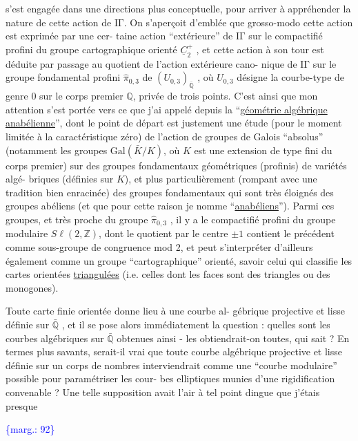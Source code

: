 \documentclass[11pt]{article}
\newcommand{\scanpage}[1]{\par\bigskip\noindent{\small\sffamily[scan #1]}\par}
\newcommand{\mspage}[1]{{\small\sffamily[p.\,#1]}}
\newcommand{\margin}[1]{\textcolor{blue}{\{\textsf{marg.:} #1\}}}
\newcommand{\uline}[1]{\underline{#1}}
\begin{document}
s'est engagée dans une directions plus conceptuelle, pour arriver
à appréhender la nature de cette action de $\mathrm{I\!\Gamma}$. On s'aperçoit
d'emblée que grosso-modo cette action est exprimée par une cer-%
taine action ``extérieure'' de $\mathrm{I\!\Gamma}$ sur le compactifié profini du
groupe cartographique orienté $\underline{C}_2^{+}$ , et cette action à son tour
est déduite par passage au quotient de l'action extérieure cano-%
nique de $\mathrm{I\!\Gamma}$ sur le groupe fondamental profini $\hat{\pi}_{0,3}$ de $(U_{0,3})_{\bar{\mathbb{Q}}}$ ,
où $U_{0,3}$ désigne la courbe-type de genre $0$ sur le corps premier
$\mathbb{Q}$, privée de trois points. C'est ainsi que mon attention s'est
portée vers ce que j'ai appelé depuis la ``\uline{géométrie algébrique}
\uline{anabélienne}'', dont le point de départ est justement une étude
(pour le moment limitée à la caractéristique zéro) de l'action
de groupes de Galois ``absolus'' (notamment les groupes $\mathrm{Gal}(\bar{K}/K)$,
où $K$ est une extension de type fini du corps premier) sur des
groupes fondamentaux géométriques (profinis) de variétés algé-%
briques (définies sur $K$), et plus particulièrement (rompant avec
une tradition bien enracinée) des groupes fondamentaux qui sont
très éloignés des groupes abéliens (et que pour cette raison je
nomme ``\uline{anabéliens}''). Parmi ces groupes, et très proche du groupe
$\hat{\pi}_{0,3}$ , il y a le compactifié profini du groupe modulaire $S\ell(2,\mathbb{Z})$,
dont le quotient par le centre $\pm 1$ contient le précédent comme
sous-groupe de congruence mod 2, et peut s'interpréter d'ailleurs
également comme un groupe ``cartographique'' orienté, savoir celui
qui classifie les cartes orientées \uline{triangulées} (i.e. celles dont
les faces sont des triangles ou des monogones).

Toute carte finie orientée donne lieu à une courbe al-%
gébrique projective et lisse définie sur $\bar{\mathbb{Q}}$ , et il se pose alors
immédiatement la question : quelles sont les courbes algébriques
sur $\bar{\mathbb{Q}}$ obtenues ainsi - les obtiendrait-on toutes, qui sait ?
En termes plus savants, serait-il vrai que toute courbe algébrique
projective et lisse définie sur un corps de nombres interviendrait
comme une ``courbe modulaire'' possible pour paramétriser les cour-%
bes elliptiques munies d'une rigidification convenable ? Une telle
supposition avait l'air à tel point dingue que j'étais presque

\margin{92}

\clearpage
\scanpage{119/93}
\mspage{15}
\end{document}
